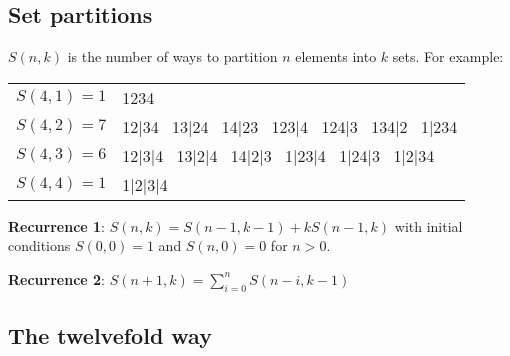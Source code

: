 \documentclass[a4paper,11pt]{article}
\begin{document}
\subsection{Set partitions}

$S(n,k)$ is the number of ways to partition $n$ elements into $k$ sets. For example:

\begin{tabular}{|l|l|}
\hline
	$S(4,1)=1$ & 1234  \\
	$S(4,2)=7$ & 12|34 \, 13|24 \, 14|23 \, 123|4 \, 124|3 \, 134|2 \, 1|234 \\
	$S(4,3)=6$ & 12|3|4 \, 13|2|4 \, 14|2|3 \, 1|23|4 \, 1|24|3 \, 1|2|34 \\
	$S(4,4)=1$ & 1|2|3|4  \\
\hline
\end{tabular}

{\bf Recurrence 1}: $S(n,k)=S(n-1,k-1)+kS(n-1,k)$ with initial conditions $S(0,0)=1$ and $S(n,0)=0$ for $n>0$.

{\bf Recurrence 2}: $S(n+1,k)=\sum_{i=0}^n S(n-i,k-1)$

\subsection{The twelvefold way}
\end{document}

